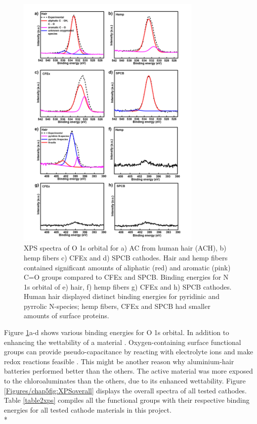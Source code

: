 \begin{figure}[h!]
  \centering
  \includegraphics[width=0.8\textwidth]{Figures/chap5fig/XPSON}
    \caption{XPS spectra of O 1s orbital for a) AC from human hair (ACH), b) hemp fibers c) CFEx and d) SPCB cathodes. Hair and hemp fibers contained significant amounts of aliphatic (red) and aromatic (pink) C=O groups  compared to CFEx and SPCB. Binding energies for N 1s orbital of e) hair, f) hemp fibers g) CFEx and h) SPCB cathodes. Human hair displayed distinct binding energies for pyridinic and pyrrolic N-species; hemp fibers, CFEx and SPCB had smaller amounts of surface proteins.}
  \label{Figures/chap5fig:XPSON}
\end{figure}

Figure \ref{Figures/chap5fig:XPSON}a-d shows various binding energies for O 1s orbital. In addition to enhancing the wettability of a material \cite{li_effect_2011, oh_oxygen_2014}. Oxygen-containing surface functional groups can provide pseudo-capacitance by reacting with electrolyte ions and make redox reactions feasible \cite{bleda-martinez_role_2005}. This might be another reason why aluminium-hair batteries performed better than the others. The active material was more exposed to the chloroaluminates than the others, due to its enhanced wettability. Figure \ref{Figures/chap5fig:XPSoverall} displays the overall spectra of all tested cathodes. Table \ref{table2xps} compiles all the functional groups with their respective binding energies for all tested cathode materials in this project. \\*

